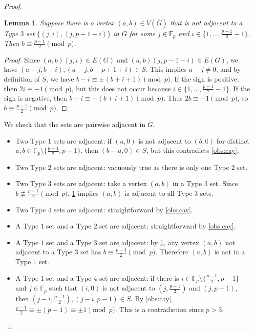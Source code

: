 \documentclass[11pt]{article}
\numberwithin{equation}{section}
\theoremstyle{plain}
\newtheorem{lem}[equation]{Lemma}
\theoremstyle{definition}
\newcommand{\F}{\mathbb{F}}
\begin{document}
\begin{proof}
    \begin{lem}
        \label{lem:minorConnection}
        Suppose there is a vertex $(a,b) \in V(\overline{G})$ that is not adjacent to a Type $3$ set $\{ (j, i), (j, p-1-i) \}$ in $\overline{G}$ for some $j \in \F_p$ and $i \in \{ 1, \dots, \frac{p-1}{2} - 1 \}$. Then $b \equiv \frac{p-1}{2} \pmod{p}$.
    \end{lem}
    \begin{proof}
        Since $(a,b)(j,i) \in E(G)$ and $(a,b)(j, p-1-i) \in E(G)$, we have $(a-j, b-i), (a-j, b-p+1+i) \in S$. This implies $a-j \neq 0$, and by definition of $S$, we have $b-i \equiv \pm (b+i+1) \pmod{p}$. If the sign is positive, then $2i \equiv -1 \pmod{p}$, but this does not occur because $i \in \{ 1, \dots, \frac{p-1}{2} - 1 \}$. If the sign is negative, then $b-i \equiv -(b+i+1) \pmod{p}$. Thus $2b \equiv -1 \pmod{p}$, so $b \equiv \frac{p-1}{2} \pmod{p}$.
    \end{proof}
    We check that the sets are pairwise adjacent in $\overline{G}$.
    \begin{itemize}
        \item Two Type $1$ sets are adjacent: if $(a,0)$ is not adjacent to $(b,0)$ for distinct $a, b \in \F_p \setminus \{\frac{p-1}{2}, p -1\}$, then $(b-a, 0) \in S$, but this contradicts \cref{obs:cay}.
        \item Two Type $2$ sets are adjacent: vacuously true as there is only one Type $2$ set.
        \item Two Type $3$ sets are adjacent: take a vertex $(a,b)$ in a Type $3$ set. Since $b \not\equiv \frac{p-1}{2} \pmod{p}$, \cref{lem:minorConnection} implies $(a,b)$ is adjacent to all Type $3$ sets.
        \item Two Type $4$ sets are adjacent: straightforward by \cref{obs:cay}.
        \item A Type $1$ set and a Type $2$ set are adjacent: straightforward by \cref{obs:cay}.
        \item A Type $1$ set and a Type $3$ set are adjacent: by \cref{lem:minorConnection}, any vertex $(a,b)$ not adjacent to a Type $3$ set has $b \equiv \frac{p-1}{2} \pmod{p}$. Therefore $(a,b)$ is not in a Type $1$ set.
        \item A Type $1$ set and a Type $4$ set are adjacent: if there is $i \in \F_p \setminus \{\frac{p-1}{2}, p -1\}$ and $j \in \F_p$ such that $(i,0)$ is not adjacent to $(j, \frac{p-1}{2})$ and $(j, p-1)$, then $(j-i, \frac{p-1}{2}), (j-i, p-1) \in S$. By \cref{obs:cay}, $\frac{p-1}{2} \equiv \pm (p-1) \equiv \pm 1  \pmod{p}$. This is a contradiction since $p > 3$.

\end{itemize}
\end{proof}
\end{document}
